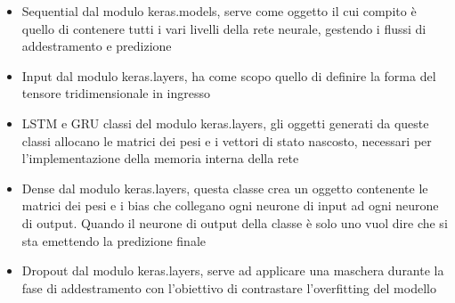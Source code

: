 \begin{itemize}
	\item Sequential dal modulo keras.models, serve come oggetto il cui compito è quello di contenere tutti i vari livelli della rete neurale, gestendo i flussi di addestramento e predizione
	\item Input dal modulo keras.layers, ha come scopo quello di definire la forma del tensore tridimensionale in ingresso
	\item LSTM e GRU classi del modulo keras.layers, gli oggetti generati da queste classi allocano le matrici dei pesi e i vettori di stato nascosto, necessari per l'implementazione della memoria interna della rete
	\item Dense dal modulo keras.layers, questa classe crea un oggetto contenente le matrici dei pesi e i bias che collegano ogni neurone di input ad ogni neurone di output. Quando il neurone di output della classe è solo uno vuol dire che si sta emettendo la predizione finale
	\item Dropout dal modulo keras.layers, serve ad applicare una maschera durante la fase di addestramento con  l'obiettivo di contrastare l'overfitting del modello
\end{itemize}

